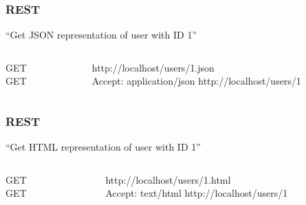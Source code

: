 \begin{frame}
  \frametitle{REST}
  \begin{center}
  ``Get JSON representation of user with ID 1''
  \end{center}
  \begin{columns}
    \begin{column}{.2\textwidth}
      \begin{flushright}
      GET\\
      GET
      \end{flushright}
    \end{column}    
    \begin{column}{.8\textwidth}
      \begin{flushleft}
      http://localhost/users/1\alert{.json}\\
      \alert{Accept: application/json} http://localhost/users/1
      \end{flushleft}
    \end{column}    
  \end{columns}
\end{frame}

\begin{frame}
  \frametitle{REST}
  \begin{center}
  ``Get HTML representation of user with ID 1''
  \end{center}
  \begin{columns}
    \begin{column}{.2\textwidth}
      \begin{flushright}
      GET\\
      GET
      \end{flushright}
    \end{column}    
    \begin{column}{.8\textwidth}
      \begin{flushleft}
      http://localhost/users/1\alert{.html}\\
      \alert{Accept: text/html} http://localhost/users/1
      \end{flushleft}
    \end{column}    
  \end{columns}
\end{frame}

